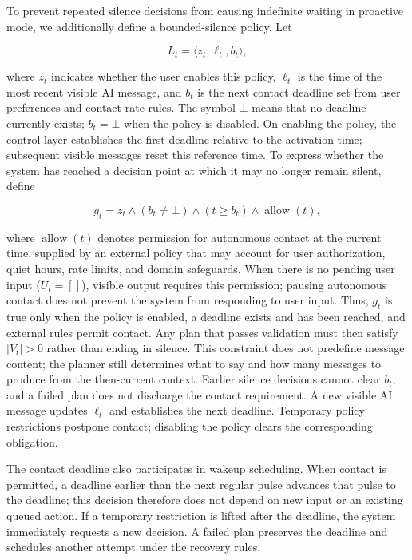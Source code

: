 \documentclass[manuscript,nonacm]{acmart}
\begin{document}
To prevent repeated silence decisions from causing indefinite waiting in
proactive mode, we additionally define a bounded-silence policy. Let

\begin{equation}
L_t=\langle z_t,\ell_t,b_t\rangle,
\end{equation}

where $z_t$ indicates whether the user enables this policy, $\ell_t$ is the time
of the most recent visible AI message, and $b_t$ is the next contact deadline
set from user preferences and contact-rate rules. The symbol $\bot$ means that
no deadline currently exists; $b_t=\bot$ when the policy is disabled. On enabling
the policy, the control layer establishes the first deadline relative to the
activation time; subsequent visible messages reset this reference time. To express
whether the system has reached a decision point at which it may no longer remain
silent, define

\begin{equation}
g_t=z_t\land(b_t\neq\bot)\land(t\geq b_t)
\land\operatorname{allow}(t),
\end{equation}

where $\operatorname{allow}(t)$ denotes permission for autonomous contact at the
current time, supplied by an external policy that may account for user
authorization, quiet hours, rate limits, and domain safeguards. When there is no
pending user input ($U_t=[]$), visible output requires this permission; pausing
autonomous contact does not prevent the system from responding to user input.
Thus, $g_t$ is true only when the policy is enabled, a deadline exists and has been
reached, and external rules permit contact. Any plan that passes validation must
then satisfy $|V_t|>0$ rather than ending in silence. This constraint does not
predefine message content; the planner still determines what to say and how many
messages to produce from the then-current context. Earlier silence decisions
cannot clear $b_t$, and a failed plan does not discharge the contact requirement.
A new visible AI message updates $\ell_t$ and establishes the next deadline.
Temporary policy restrictions postpone contact; disabling the policy clears the
corresponding obligation.

The contact deadline also participates in wakeup scheduling. When contact is
permitted, a deadline earlier than the next regular pulse advances that pulse
to the deadline; this decision therefore does not depend on new input or an
existing queued action. If a temporary restriction is lifted after the deadline,
the system immediately requests a new decision. A failed plan preserves the
deadline and schedules another attempt under the recovery rules.
\end{document}
